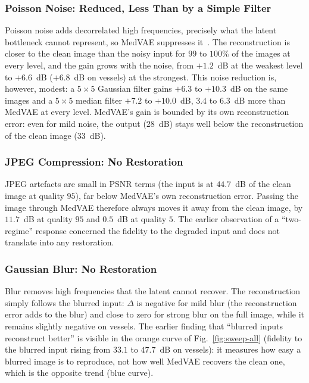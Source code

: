 \documentclass[conference]{IEEEtran}
\begin{document}
\subsubsection{Poisson Noise: Reduced, Less Than by a Simple Filter}
\label{sec:poisson}

Poisson noise adds decorrelated high frequencies, precisely what the
latent bottleneck cannot represent, so MedVAE suppresses
it~\cite{vincent2008denoising}. The reconstruction is closer to the
clean image than the noisy input for $99$ to $100\%$ of the images at
every level, and the gain grows with the noise, from $+1.2$~dB at the
weakest level to $+6.6$~dB ($+6.8$~dB on vessels) at the strongest. This
noise reduction is, however, modest: a $5\times5$ Gaussian filter gains
$+6.3$ to $+10.3$~dB on the same images and a $5\times5$ median filter
$+7.2$ to $+10.0$~dB, $3.4$ to $6.3$~dB more than MedVAE at every level. MedVAE's
gain is bounded by its own reconstruction error: even for mild noise,
the output ($28$~dB) stays well below the reconstruction of the clean
image ($33$~dB).

\subsubsection{JPEG Compression: No Restoration}
\label{sec:jpeg}

JPEG artefacts are small in PSNR terms (the input is at $44.7$~dB of
the clean image at quality $95$), far below MedVAE's own reconstruction
error. Passing the image through MedVAE therefore always moves it away
from the clean image, by $11.7$~dB at quality $95$ and $0.5$~dB at
quality $5$. The earlier observation of a ``two-regime'' response
concerned the fidelity to the degraded input and does not translate
into any restoration.

\subsubsection{Gaussian Blur: No Restoration}
\label{sec:flou}

Blur removes high frequencies that the latent cannot recover. The
reconstruction simply follows the blurred input: $\Delta$ is negative
for mild blur (the reconstruction error adds to the blur) and close to
zero for strong blur on the full image, while it remains slightly
negative on vessels. The earlier finding that ``blurred inputs
reconstruct better'' is visible in the orange curve of
Fig.~\ref{fig:sweep-all} (fidelity to the blurred input rising from
$33.1$ to $47.7$~dB on vessels): it measures
how easy a blurred image is to reproduce, not how well MedVAE recovers
the clean one, which is the opposite trend (blue curve).
\end{document}
